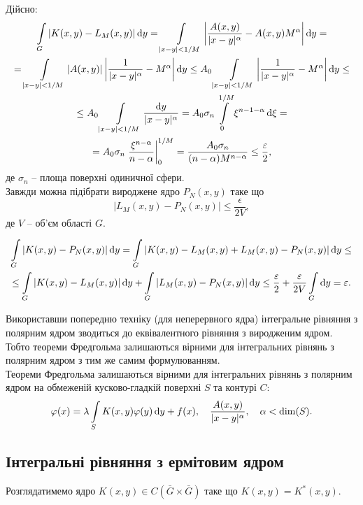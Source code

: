 Дійсно:
\begin{multline*} 
	\displaystyle\int\limits_G |K(x, y) - L_M(x, y)| \mathop{}\!\mathrm{d} y = \displaystyle\int\limits_{|x - y| < 1 / M} \left| \dfrac{A(x, y)}{|x - y|^\alpha} - A(x, y) M^\alpha \right| \mathop{}\!\mathrm{d} y = \\
	= \displaystyle\int\limits_{|x - y| < 1 /M} |A(x, y)| \left| \dfrac{1}{|x - y|^\alpha} - M^\alpha \right| \mathop{}\!\mathrm{d} y \le A_0 \displaystyle\int\limits_{|x - y| < 1 /M} \left| \dfrac{1}{|x - y|^\alpha} - M^\alpha \right| \mathop{}\!\mathrm{d} y \le \\
	\le A_0 \displaystyle\int\limits_{|x - y| < 1 /M} \dfrac{\mathop{}\!\mathrm{d} y}{|x - y|^\alpha} = A_0 \sigma_n \displaystyle\int\limits_0^{1 / M} \xi^{n - 1 - \alpha} \mathop{}\!\mathrm{d} \xi = \\
	= A_0 \sigma_n \left.\dfrac{\xi^{n - \alpha}}{n - \alpha}\right|_0^{1 / M} = \dfrac{A_0\sigma_n}{(n - \alpha)M^{n - \alpha}} \le \dfrac{\varepsilon}{2},
\end{multline*}
де $\sigma_n$ -- площа поверхні одиничної сфери. \\

Завжди можна підібрати вироджене ядро $P_N(x, y)$ таке що \[ |L_M(x, y) - P_N(x, y)| \le \dfrac{\epsilon}{2V}, \] де $V$ -- об'єм області $G$. 

\begin{multline*}
	\displaystyle\int\limits_G |K(x, y) - P_N(x, y)| \mathop{}\!\mathrm{d} y = \displaystyle\int\limits_G | K(x, y) - L_M(x, y) + L_M(x, y) - P_N(x, y)| \mathop{}\!\mathrm{d} y \le \\
	\le \displaystyle\int\limits_G | K(x, y) - L_M(x, y)| \mathop{}\!\mathrm{d} y + \displaystyle\int\limits_G |L_M(x, y) - P_N(x, y)| \mathop{}\!\mathrm{d} y \le \dfrac{\varepsilon}{2} + \dfrac{\varepsilon}{2V} \displaystyle\int\limits_G \mathop{}\!\mathrm{d} y = \varepsilon.
\end{multline*}

Використавши попередню техніку (для неперервного ядра) інтегральне рівняння з полярним ядром зводиться до еквівалентного рівняння з виродженим ядром. Тобто теореми Фредгольма залишаються вірними для інтегральних рівнянь з полярним ядром з тим же самим формулюванням. \\

Теореми Фредгольма залишаються вірними для інтегральних рівнянь з полярним ядром на обмеженій кусково-гладкій поверхні $S$ та контурі $C$:
\[ \varphi(x) = \lambda \displaystyle\int\limits_S K(x, y) \varphi(y) \mathop{}\!\mathrm{d} y + f(x), \quad \dfrac{A(x, y)}{|x - y|^\alpha}, \quad \alpha < \dim(S). \]

\subsection{Інтегральні рівняння з ермітовим ядром}

Розглядатимемо ядро $K(x, y) \in C(\bar G \times \bar G)$ таке що $K(x, y) = K^*(x, y)$. \\

